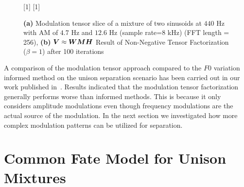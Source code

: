 \begin{figure}[!h]
\centering
[1\textwidth]{}%
\hspace{0.3\textwidth} %
[1\textwidth]{}%
\caption{\textbf{(a)} Modulation tensor slice of a mixture of two sinusoids at $440$ Hz with AM of $4.7$ Hz and $12.6$ Hz (sample rate=$8$ kHz)  (FFT length = 256), \textbf{(b)}  ${\bm{V}} \approx {\bm{W}} {\bm{M}} {\bm{H}}$ Result of Non-Negative Tensor Factorization ($\beta = 1$) after 100 iterations}
\label{fig:am_ntf}
\end{figure}
\par
A comparison of the modulation tensor approach compared to the \(F0\) variation informed method on the unison separation scenario has been carried out in our work published in~\cite{stoeter14}.
Results indicated that the modulation tensor factorization generally performs worse than informed methods.
This is because it only considers amplitude modulations even though frequency modulations are the
actual source of the modulation.
In the next section we investigated how more complex modulation patterns can be utilized for separation.

\section{Common Fate Model for Unison Mixtures}%
\label{sec:the_common_fate_model_for_unison_mixtures}


